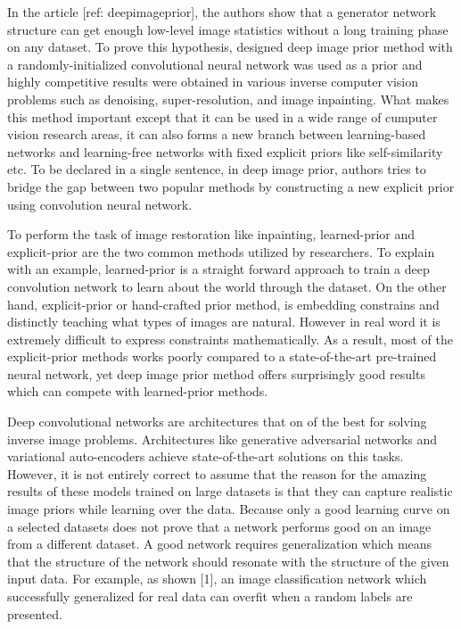 In the article [ref: deepimageprior], the authors show that a generator network structure can get enough low-level image statistics without a long training phase on any dataset. To prove this hypothesis, designed deep image prior method with a randomly-initialized convolutional neural network was used as a prior and highly competitive results were obtained in various inverse computer vision problems such as denoising, super-resolution, and image inpainting. What makes this method important except that it can be used in a wide range of cumputer vision research areas, it can also forms a new branch between learning-based networks and learning-free networks with fixed explicit priors like self-similarity etc. To be declared in a single sentence, in deep image prior, authors tries to bridge the gap between two popular methods by constructing a new explicit prior using convolution neural network.

To perform the task of image restoration like inpainting, learned-prior and explicit-prior are the two common methods utilized by researchers. To explain with an example, learned-prior is a straight forward approach to train a deep convolution network to learn about the world through the dataset. On the other hand, explicit-prior or hand-crafted prior method, is embedding constrains and distinctly teaching what types of images are natural. However in real word it is extremely difficult to express constraints mathematically. As a result, most of the explicit-prior methods works poorly compared to a state-of-the-art pre-trained neural network, yet deep image prior method offers surprisingly good results which can compete with learned-prior methods.

Deep convolutional networks are architectures that on of the best for solving inverse image problems. Architectures like generative adversarial networks and variational auto-encoders achieve state-of-the-art solutions on this tasks. However, it is not entirely correct to assume that the reason for the amazing results of these models trained on large datasets is that they can capture realistic image priors while learning over the data. Because only a good learning curve on a selected datasets does not prove that a network performs good on an image from a different dataset. A good network requires generalization which means that the structure of the network should resonate with the structure of the given input data. For example, as shown [1], an image classification network which successfully generalized for real data can overfit when a random labels are presented.


